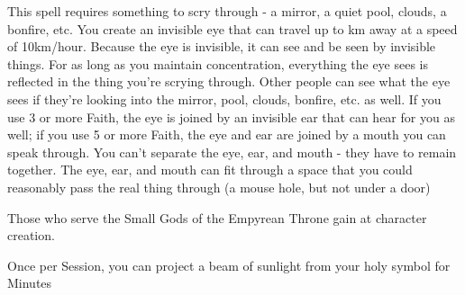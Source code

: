 {\LITURGY [
  Name= Scry,
  Link=thoth-liturgy-scry,
  Paradigm= Prophesy ,
  Save=  N ,
  Duration= Concentration ,
  Counter=  n/a  ,
  Keywords= None ,
  Target=   Something up to \DICE km away
]



This spell requires something to scry through - a mirror, a quiet pool, clouds, a bonfire, etc.  You create an invisible eye that can travel up to \DICE km away at a speed of 10km/hour.  Because the eye is invisible, it can see and be seen by invisible things.  For as long as you maintain concentration, everything the eye sees is reflected in the thing you're scrying through.  Other people can see what the eye sees if they're looking into the mirror, pool, clouds, bonfire, etc.  as well. 
If you use 3 or more Faith, the eye is joined by an invisible ear that can hear for you as well; if you use 5 or more Faith, the eye and ear are joined by a mouth you can speak through.  You can't separate the eye, ear, and mouth - they have to remain together.  The eye, ear, and mouth can fit through a space that you could reasonably pass the real thing through (a mouse hole, but not under a door)


\newpage




Those who serve the Small Gods of the Empyrean Throne gain \DCUP \FOC at character creation.





\GOD[
Name=Asura,
Link=small-god-asura,
GodOf=Seraph of Sunlight,
Holy=polished mirrors or brass hung from the neck or belt
]


Once per Session, you can project a beam of sunlight from your holy symbol for Minutes


}
